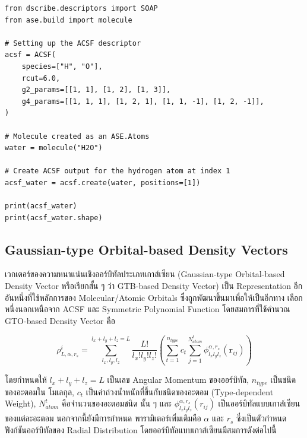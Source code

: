 \begin{lstlisting}[style=MyPython]
from dscribe.descriptors import SOAP
from ase.build import molecule

# Setting up the ACSF descriptor
acsf = ACSF(
    species=["H", "O"],
    rcut=6.0,
    g2_params=[[1, 1], [1, 2], [1, 3]],
    g4_params=[[1, 1, 1], [1, 2, 1], [1, 1, -1], [1, 2, -1]],
)

# Molecule created as an ASE.Atoms
water = molecule("H2O")

# Create ACSF output for the hydrogen atom at index 1
acsf_water = acsf.create(water, positions=[1])

print(acsf_water)
print(acsf_water.shape)
\end{lstlisting}

\subsection{Gaussian-type Orbital-based Density Vectors}
\label{ssec:gauss_orb_den}

เวกเตอร์ของความหนาแน่นเชิงออร์บิทัลประเภทเกาส์เซียน (Gaussian-type Orbital-based Density Vector หรือเรียกสั้น ๆ ว่า GTB-based 
Density Vector) เป็น Representation อีกอันหนึ่งที่ใช้หลักการของ Molecular/Atomic Orbitals ซึ่งถูกพัฒนาขึ้นมาเพื่อให้เป็นอีกทาง%
เลือกหนึ่งนอกเหนือจาก ACSF และ Symmetric Polynomial Function\autocite{kwac2021} โดยสมการที่ใช้คำนวณ GTO-based Density 
Vector คือ

\begin{equation}\label{eq:gto_density}
    \rho^{i}_{L,\alpha,r_{s}} = \sum^{l_{x}+l_{y}+l_{z} = L}_{l_{x},l_{y},l_{z}} 
    \frac{L!}{l_{x}!l_{y}!l_{z}!} \left ( \sum^{n_{type}}_{t=1} c_{t} \sum^{N^{t}_{atom}}_{j=1} 
    \phi^{\alpha,r_{s}}_{l_{x}l_{y}l_{z}} (\bm{r}_{ij}) \right )
\end{equation}

\noindent โดยกำหนดให้ $l_{x}+l_{y}+l_{z} = L$ เป็นเลข Angular Momentum ของออร์บิทัล, $n_{type}$ เป็นชนิดของอะตอมใน%
โมเลกุล, $c_{t}$ เป็นค่าถ่วงน้ำหนักที่ขึ้นกับชนิดของอะตอม (Type-dependent Weight), $N^{t}_{atom}$ คือจำนวนของอะตอมชนิด%
นั้น ๆ และ $\phi^{\alpha,r_{s}}_{l_{x}l_{y}l_{z}} (r_{ij})$ เป็นออร์บิทัลแบบเกาส์เซียนของแต่ละอะตอม นอกจากนี้ยังมีการกำหนด%
พารามิเตอร์เพิ่มเติมคือ $\alpha$ และ $r_{s}$ ซึ่งเป็นตัวกำหนดฟังก์ชันออร์บิทัลของ Radial Distribution\autocite{kwac2021} 
โดยออร์บิทัลแบบเกาส์เซียนมีสมการดังต่อไปนี้

